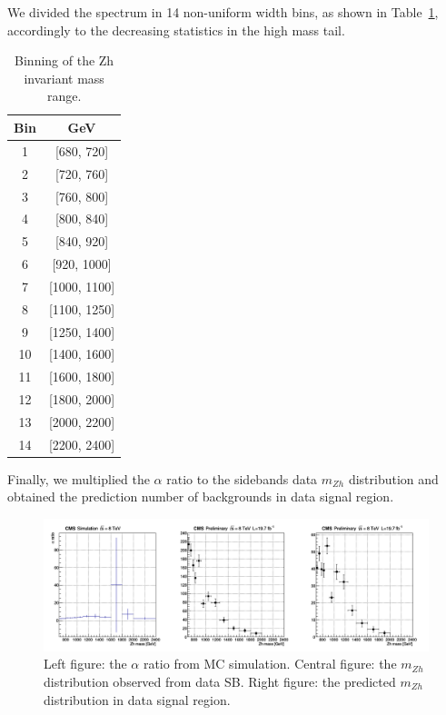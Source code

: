 We divided the spectrum in 14 non-uniform width bins, as shown in Table~\ref{tab:bin}, accordingly to the decreasing statistics in the high mass tail.

\begin{center}
  \begin{table}[h]
    \begin{center}
      \begin{tabular}{c|c}
        \hline
        \bf Bin & \bf GeV \\
        \hline
        \hline
        1 & [680, 720] \\
        2 & [720, 760] \\
        3 & [760, 800] \\
        4 & [800, 840] \\
        5 & [840, 920] \\
        6 & [920, 1000] \\
        7 & [1000, 1100] \\
        8 & [1100, 1250] \\
        9 & [1250, 1400] \\
        10 & [1400, 1600] \\
        11 & [1600, 1800] \\
        12 & [1800, 2000] \\
        13 & [2000, 2200] \\
        14 & [2200, 2400] \\
        \hline
      \end{tabular}
    \end{center}
    \caption{\label{tab:bin}Binning of the Zh invariant mass range.}
  \end{table}
\end{center}

Finally, we multiplied the $\alpha$ ratio to the sidebands data $m_{Zh}$ distribution and obtained the prediction number of backgrounds in data signal region.

\begin{figure}[hbtp]
  \begin{center}
    \includegraphics[width=\textwidth]{figure/CH3/alpha.png}
  \end{center}
  \caption{\label{fig:alpha}Left figure: the $\alpha$ ratio from MC simulation. Central figure: the $m_{Zh}$ distribution observed from data SB. Right figure: the predicted $m_{Zh}$ distribution in data signal region. }
\end{figure}

